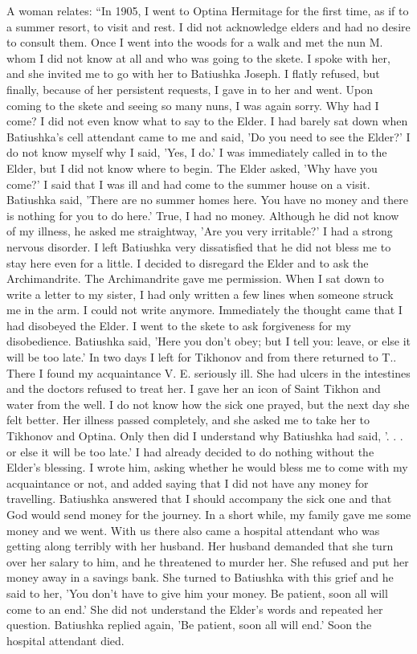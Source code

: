 A woman relates: “In 1905, I went to Optina Hermitage for the first time, as if to a summer resort, to visit and rest. I did not acknowledge elders and had no desire to consult them. Once I went into the woods for a walk and met the nun M. whom I did not know at all and who was going to the skete. I spoke with her, and she invited me to go with her to Batiushka Joseph. I flatly refused, but finally, because of her persistent requests, I gave in to her and went. Upon coming to the skete and seeing so many nuns, I was again sorry. Why had I come? I did not even know what to say to the Elder. I had barely sat down when Batiushka's cell attendant came to me and said, 'Do you need to see the Elder?' I do not know myself why I said, 'Yes, I do.' I was immediately called in to the Elder, but I did not know where to begin. The Elder asked, 'Why have you come?' I said that I was ill and had come to the summer house on a visit. Batiushka said, 'There are no summer homes here. You have no money and there is nothing for you to do here.' True, I had no money. Although he did not know of my illness, he asked me straightway, 'Are you very irritable?' I had a strong nervous disorder. I left Batiushka very dissatisfied that he did not bless me to stay here even for a little. I decided to disregard the Elder and to ask the Archimandrite. The Archimandrite gave me permission. When I sat down to write a letter to my sister, I had only written a few lines when someone struck me in the arm. I could not write anymore. Immediately the thought came that I had disobeyed the Elder. I went to the skete to ask forgiveness for my disobedience. Batiushka said, 'Here you don't obey; but I tell you: leave, or else it will be too late.' In two days I left for Tikhonov and from there returned to T.. There I found my acquaintance V. E. seriously ill. She had ulcers in the intestines and the doctors refused to treat her. I gave her an icon of Saint Tikhon and water from the well. I do not know how the sick one prayed, but the next day she felt better. Her illness passed completely, and she asked me to take her to Tikhonov and Optina. Only then did I understand why Batiushka had said, '. . . or else it will be too late.' I had already decided to do nothing without the Elder's blessing. I wrote him, asking whether he would bless me to come with my acquaintance or not, and added saying that I did not have any money for travelling. Batiushka answered that I should accompany the sick one and that God would send money for the journey. In a short while, my family gave me some money and we went. With us there also came a hospital attendant who was getting along terribly with her husband. Her husband demanded that she turn over her salary to him, and he threatened to murder her. She refused and put her money away in a savings bank. She turned to Batiushka with this grief and he said to her, 'You don't have to give him your money. Be patient, soon all will come to an end.' She did not understand the Elder's words and repeated her question. Batiushka replied again, 'Be patient, soon all will end.' Soon the hospital attendant died.

